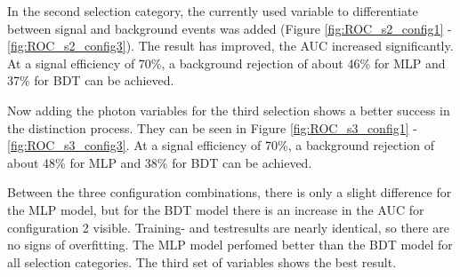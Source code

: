 \documentclass[11pt]{scrartcl}
\begin{document}
		In the second selection category, the currently used variable to differentiate between signal and background events was added (Figure \ref{fig:ROC_s2_config1} - \ref{fig:ROC_s2_config3}). The result has improved, the AUC increased significantly. At a signal efficiency of 70\%, a background rejection of about 46\% for MLP and 37\% for BDT can be achieved.
		
		Now adding the photon variables for the third selection shows a better success in the distinction process. They can be seen in Figure \ref{fig:ROC_s3_config1} - \ref{fig:ROC_s3_config3}. At a signal efficiency of 70\%, a background rejection of about 48\% for MLP and 38\% for BDT can be achieved.
		
		Between the three configuration combinations, there is only a slight difference for the MLP model, but for the BDT model there is an increase in the AUC for configuration 2 visible. Training- and testresults are nearly identical, so there are no signs of overfitting. The MLP model perfomed better than the BDT model for all selection categories. The third set of variables shows the best result.
				
\end{document}
